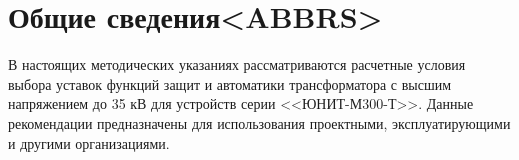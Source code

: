 \color{unimain}\section[Общие сведения]{\sloppy Общие сведения\color{white!0}<ABBRS>} %
\color{black}

В настоящих методических указаниях рассматриваются расчетные условия выбора уставок функций защит и автоматики трансформатора с высшим напряжением до 35 кВ для устройств серии <<ЮНИТ-М300-Т>>. Данные рекомендации предназначены для использования проектными, эксплуатирующими и другими организациями.